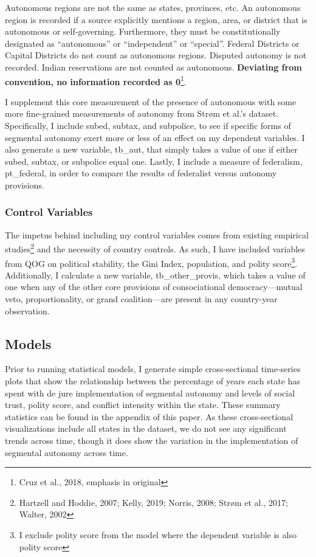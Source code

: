 \documentclass[12pt]{article}
\begin{document}
\singlespacing
Autonomous regions are not the same as states, provinces, etc. An autonomous region is recorded if a source explicitly mentions a region, area, or district that is autonomous or self-governing. Furthermore, they must be constitutionally designated as “autonomous” or “independent” or “special”. Federal Districts or Capital
Districts do not count as autonomous regions. Disputed autonomy is not recorded. Indian reservations are
not counted as autonomous. \textbf{Deviating from convention, no information recorded as 0}\footnote{Cruz et al., 2018, emphasis in original}.

\doublespacing
I supplement this core measurement of the presence of autonomous with some more fine-grained measurements of autonomy from Strøm et al.’s dataset. Specifically, I include subed, subtax, and subpolice, to see if specific forms of segmental autonomy exert more or less of an effect on my dependent variables. I also generate a new variable, tb\_aut, that simply takes a value of one if either subed, subtax, or subpolice equal one. Lastly, I include a measure of federalism, pt\_federal, in order to compare the results of federalist versus autonomy provisions.  

\subsubsection{Control Variables} 
The impetus behind including my control variables comes from existing empirical studies\footnote{Hartzell and Hoddie, 2007; Kelly, 2019; Norris, 2008; Strøm et al., 2017; Walter, 2002} and the necessity of country controls. As such, I have included variables from QOG on political stability, the Gini Index, population, and polity score\footnote{I exclude polity score from the model where the dependent variable is also polity score}. Additionally, I calculate a new variable, tb\_other\_provis, which takes a value of one when any of the other core provisions of consociational democracy—mutual veto, proportionality, or grand coalition—are present in any country-year observation. 

\subsection{Models}
Prior to running statistical models, I generate simple cross-sectional time-series plots that show the relationship between the percentage of years each state has spent with de jure implementation of segmental autonomy and levels of social trust, polity score, and conflict intensity within the state. These summary statistics can be found in the appendix of this paper. As these cross-sectional visualizations include all states in the dataset, we do not see any significant trends across time, though it does show the variation in the implementation of segmental autonomy across time. 
\end{document}
